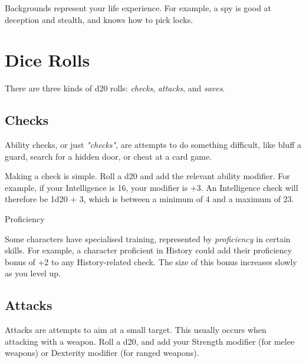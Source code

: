 \documentclass[letterpaper,twocolumn,openany,nodeprecatedcode]{dndbook}
\begin{document}
Backgrounds represent your life experience. For example, a spy is good at deception and stealth, and knows how to pick locks. 


\section{Dice Rolls}

There are three kinds of d20 rolls: \textit{checks}, \textit{attacks}, and \textit{saves}.

\subsection{Checks}
Ability checks, or just \textit{"checks"}, are attempts to do something difficult, like bluff a guard, search for a hidden door, or cheat at a card game. 

Making a check is simple. Roll a d20 and add the relevant ability modifier. For example, if your Intelligence is 16, your modifier is +3. An Intelligence check will therefore be 1d20 + 3, which is between a minimum of 4 and a maximum of 23. 

\begin{DndComment}{Proficiency}

\noindent Some characters have specialised training, represented by \textit{proficiency} in certain skills. For example, a character proficient in History could add their proficiency bonus of +2 to any History-related check. The size of this bonus increases slowly as you level up.

\end{DndComment}

\subsection{Attacks}
Attacks are attempts to aim at a small target. This usually occurs when attacking with a weapon. Roll a d20, and add your Strength modifier (for melee weapons) or Dexterity modifier (for ranged weapons). 
\end{document}
